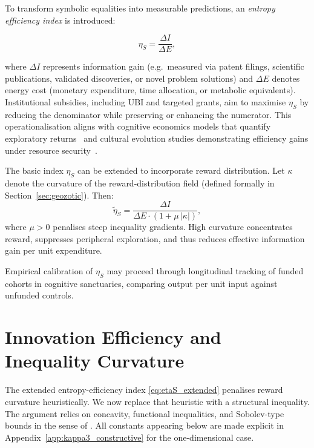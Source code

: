 \documentclass[12pt,a4paper]{article}
\theoremstyle{definition}
\begin{document}
To transform symbolic equalities into measurable predictions, an
\emph{entropy efficiency index} is introduced:

\begin{equation}
  \eta_S = \frac{\Delta I}{\Delta E},
  \label{eq:etaS}
\end{equation}

where $\Delta I$ represents information gain (e.g.\ measured via patent
filings, scientific publications, validated discoveries, or novel problem
solutions) and $\Delta E$ denotes energy cost (monetary expenditure, time
allocation, or metabolic equivalents).  Institutional subsidies, including UBI
and targeted grants, aim to maximise $\eta_S$ by reducing the denominator while
preserving or enhancing the numerator.  This operationalisation aligns with
cognitive economics models that quantify exploratory
returns~\citep{friston2023} and cultural evolution studies demonstrating
efficiency gains under resource security~\citep{henrich2016}.

\begin{tcolorbox}[formalbox, title={Extended Index: Inequality Penalty}]
  The basic index $\eta_S$ can be extended to incorporate reward distribution.
  Let $\kappa$ denote the curvature of the reward-distribution field (defined
  formally in Section~\ref{sec:geozotic}).  Then:
  \begin{equation}
    \tilde{\eta}_S = \frac{\Delta I}{\Delta E \cdot (1 + \mu\,|\kappa|)},
    \label{eq:etaS_extended}
  \end{equation}
  where $\mu > 0$ penalises steep inequality gradients.  High curvature
  concentrates reward, suppresses peripheral exploration, and thus reduces
  effective information gain per unit expenditure.
\end{tcolorbox}

Empirical calibration of $\eta_S$ may proceed through longitudinal tracking of
funded cohorts in cognitive sanctuaries, comparing output per unit input against
unfunded controls.

\section{Innovation Efficiency and Inequality Curvature}
\label{sec:eta_gini}

The extended entropy-efficiency index \eqref{eq:etaS_extended}
penalises reward curvature heuristically.
We now replace that heuristic with a structural inequality.
The argument relies on concavity, functional inequalities,
and Sobolev-type bounds in the sense of \citet{lieb2001}.
All constants appearing below are made explicit in
Appendix~\ref{app:kappa3_constructive} for the one-dimensional case.
\end{document}
